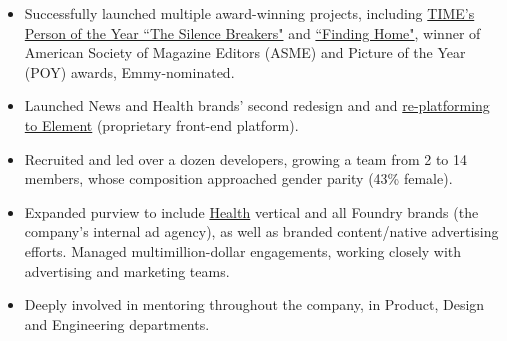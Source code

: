 \documentclass[a4paper,10pt]{memoir} %
\begin{document}
\begin{itemize}
	\item Successfully launched multiple award-winning projects, including  \href{http://time.com/time-person-of-the-year-2017-silence-breakers/}{TIME's Person of the Year ``The Silence Breakers"} and \href{http://time.com/finding-home/}{``Finding Home"}, winner of American Society of Magazine Editors (ASME) and Picture of the Year (POY) awards, Emmy-nominated.
	\item Launched News and Health brands' second redesign and and \href{https://medium.com/@acharalambides/element-the-digital-unification-of-time-inc-979656149fd3}{re-platforming to Element} (proprietary front-end platform).
	\item Recruited and led over a dozen developers, growing a team from 2 to 14 members, whose composition approached gender parity (43\% female).
	\item Expanded purview to include \href{http://www.health.com}{Health} vertical and all Foundry brands (the company's internal ad agency), as well as branded content/native advertising efforts. Managed multimillion-dollar engagements, working closely with advertising and marketing teams.
	\item Deeply involved in mentoring throughout the company, in Product, Design and Engineering departments. 
\end{itemize}
\Sep %

\end{document}
